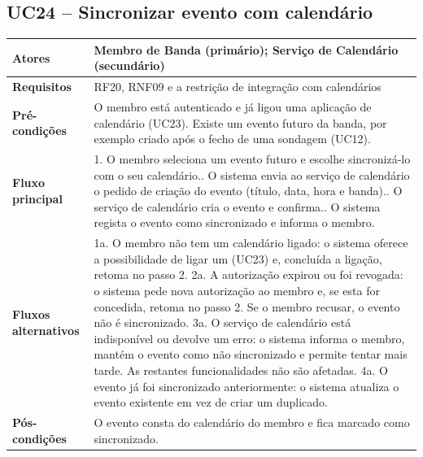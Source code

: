 \subsection{UC24 -- Sincronizar evento com calendário}
\begin{tabular}{|p{3.2cm}|p{11cm}|}
\hline
\textbf{Atores} & Membro de Banda (primário); Serviço de Calendário (secundário) \\ \hline
\textbf{Requisitos} & RF20, RNF09 e a restrição de integração com calendários \\ \hline
\textbf{Pré-condições} & O membro está autenticado e já ligou uma aplicação de calendário (UC23). Existe um evento futuro da banda, por exemplo criado após o fecho de uma sondagem (UC12). \\ \hline
\textbf{Fluxo principal} &
1. O membro seleciona um evento futuro e escolhe sincronizá-lo com o seu calendário.\newline
2. O sistema envia ao serviço de calendário o pedido de criação do evento (título, data, hora e banda).\newline
3. O serviço de calendário cria o evento e confirma.\newline
4. O sistema regista o evento como sincronizado e informa o membro. \\ \hline
\textbf{Fluxos alternativos} &
1a. O membro não tem um calendário ligado: o sistema oferece a possibilidade de ligar um (UC23) e, concluída a ligação, retoma no passo 2.\newline
2a. A autorização expirou ou foi revogada: o sistema pede nova autorização ao membro e, se esta for concedida, retoma no passo 2. Se o membro recusar, o evento não é sincronizado.\newline
3a. O serviço de calendário está indisponível ou devolve um erro: o sistema informa o membro, mantém o evento como não sincronizado e permite tentar mais tarde. As restantes funcionalidades não são afetadas.\newline
4a. O evento já foi sincronizado anteriormente: o sistema atualiza o evento existente em vez de criar um duplicado. \\ \hline
\textbf{Pós-condições} & O evento consta do calendário do membro e fica marcado como sincronizado. \\ \hline
\end{tabular}
